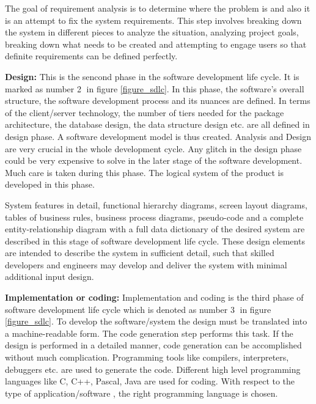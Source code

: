 The goal of requirement analysis is to determine where the problem is and also it is an attempt to fix the system requirements. This step involves breaking down the system in different pieces to analyze the situation, analyzing project goals, breaking down what needs to be created and attempting to engage users so that definite requirements can be defined perfectly.

\textbf{Design:}
This is the sencond phase in the software development life cycle. It is marked as number \textcircled{2} in figure \ref{figure_sdlc}. In this phase, the software's overall structure, the software development process and its nuances are defined. In terms of the client/server technology, the number of tiers needed for the package architecture, the database design, the data structure design etc. are all defined in design phase. A software development model is thus created. Analysis and Design are very crucial in the whole development cycle. Any glitch in the design phase could be very expensive to solve in the later stage of the software development. Much care is taken during this phase. The logical system of the product is developed in this phase.

System features in detail, functional hierarchy diagrams, screen layout diagrams, tables of business rules, business process diagrams, pseudo-code and a complete entity-relationship diagram with a full data dictionary of the desired system are described in this stage of software development life cycle. These design elements are intended to describe the system in sufficient detail, such that skilled developers and engineers may develop and deliver the system with minimal additional input design.

\textbf{Implementation or coding:}
Implementation and coding is the third phase of software development life cycle which is denoted as number \textcircled{3} in figure \ref{figure_sdlc}. To develop the software/system the design must be translated into a machine-readable form. The code generation step performs this task. If the design is performed in a detailed manner, code generation can be accomplished without much complication. Programming tools like compilers, interpreters, debuggers etc. are used to generate the code. Different high level programming languages like C, C++, Pascal, Java are used for coding. With respect to the type of application/software , the right programming language is chosen.

